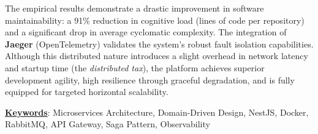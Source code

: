     The empirical results demonstrate a drastic improvement in software maintainability: a 91\% reduction in cognitive load (lines of code per repository) and a significant drop in average cyclomatic complexity. The integration of \textbf{Jaeger} (OpenTelemetry) validates the system's robust fault isolation capabilities. Although this distributed nature introduces a slight overhead in network latency and startup time (the \textit{distributed tax}), the platform achieves superior development agility, high resilience through graceful degradation, and is fully equipped for targeted horizontal scalability.

    \vspace{0.3cm}

    \textbf{\underline{Keywords}}: Microservices Architecture, Domain-Driven Design, NestJS, Docker, RabbitMQ, API Gateway, Saga Pattern, Observability
